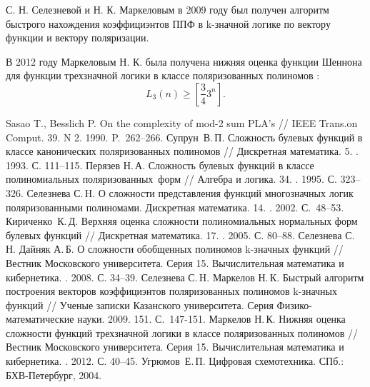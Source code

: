 \documentclass[a4paper, 14pt]{extarticle}
\begin{document}
С. Н. Селезневой и Н. К. Маркеловым в 2009 году \cite{sm09} был получен алгоритм быстрого нахождения коэффициэнтов
ППФ в k\nobreakdash-значной логике по вектору функции и вектору поляризации.

В 2012 году Маркеловым Н. К. была получена нижняя оценка функции Шеннона для функции трехзначной логики в классе
поляризованных полиномов \cite{mn12}:
$$
L_3(n) \geqslant \left[\frac{3}{4}3^n\right].
$$

\makeatletter
\renewcommand*{\@biblabel}[1]{\hfill#1.}
\makeatother

\newpage

\begin{thebibliography}{0}
 Sasao T., Besslich P. On the complexity of mod-2 sum PLA’s  // IEEE Trans.on Comput. 39. N 2. 1990. P.~262--266. 
 Супрун~В.\,П. Сложность булевых функций в классе канонических поляризованных полиномов // Дискретная математика. 5.
    . 1993. С. 111--115. 
 Перязев Н.\,А. Сложность булевых функций в классе полиномиальных поляризованных~форм // Алгебра и логика. 34.
    . 1995. С. 323--326. 
 Селезнева С.\,H. О сложности представления функций многозначных логик поляризованными полиномами. Дискретная
    математика. 14. . 2002. С.~48--53.
 Кириченко~К.\,Д. Верхняя оценка сложности полиномиальных нормальных форм булевых функций 
    // Дискретная математика. 17. . 2005. С. 80--88.
 Селезнева С.\,Н. Дайняк А.\,Б. О сложности обобщенных полиномов k\nobreakdash-значных функций // Вестник Московского
    университета. Серия 15. Вычислительная математика и кибернетика. . 2008. С. 34--39.
 Селезнева С.\,H. Маркелов Н.\,К. Быстрый алгоритм построения векторов коэффициэнтов поляризованных полиномов
    k-значных функций // Ученые записки Казанского университета. Серия Физико-математические науки. 2009. 151.
     С.~147-151.
 Маркелов Н.\,К. Нижняя оценка сложности функций трехзначной логики в классе поляризованных полиномов // Вестник
    Московского университета. Серия 15. Вычислительная математика и кибернетика. . 2012. С. 40--45.
 Угрюмов~Е.\,П. Цифровая схемотехника. СПб.: БХВ-Петербург, 2004. 

\end{thebibliography}
\end{document}
